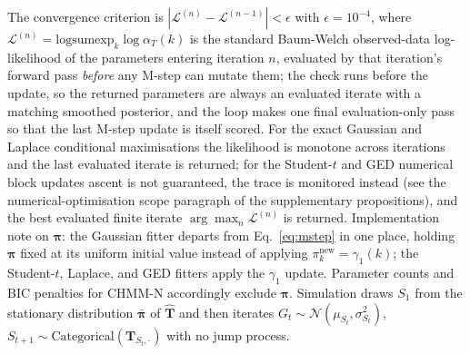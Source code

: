 The convergence criterion is $|\mathcal{L}^{(n)} - \mathcal{L}^{(n-1)}| < \epsilon$ with $\epsilon = 10^{-4}$, where $\mathcal{L}^{(n)} = \text{logsumexp}_k \log \alpha_T(k)$ is the standard Baum-Welch observed-data log-likelihood of the parameters entering iteration $n$, evaluated by that iteration's forward pass \emph{before} any M-step can mutate them; the check runs before the update, so the returned parameters are always an evaluated iterate with a matching smoothed posterior, and the loop makes one final evaluation-only pass so that the last M-step update is itself scored. For the exact Gaussian and Laplace conditional maximisations the likelihood is monotone across iterations and the last evaluated iterate is returned; for the Student-$t$ and GED numerical block updates ascent is not guaranteed, the trace is monitored instead (see the numerical-optimisation scope paragraph of the supplementary propositions), and the best evaluated finite iterate $\arg\max_n \mathcal{L}^{(n)}$ is returned. Implementation note on $\boldsymbol\pi$: the Gaussian fitter departs from Eq.~\eqref{eq:mstep} in one place, holding $\boldsymbol\pi$ fixed at its uniform initial value instead of applying $\pi_k^{\text{new}} = \gamma_1(k)$; the Student-$t$, Laplace, and GED fitters apply the $\gamma_1$ update. Parameter counts and BIC penalties for CHMM-N accordingly exclude $\boldsymbol\pi$. Simulation draws $S_1$ from the stationary distribution $\bar{\boldsymbol\pi}$ of $\hat{\mathbf T}$ and then iterates $G_t \sim \mathcal{N}(\mu_{S_t}, \sigma_{S_t}^2)$, $S_{t+1} \sim \text{Categorical}(\mathbf{T}_{S_t, \cdot})$ with no jump process.

